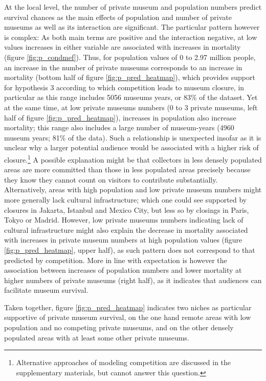 \documentclass[12pt]{article}
\begin{document}
At the local level, the number of private museum and population numbers predict survival chances as the main effects of population and number of private museums as well as its interaction are significant.
The particular pattern however is complex:
As both main terms are positive and the interaction negative, at low values increases in either variable are associated with increases in mortality (figure \ref{fig:p_condmef}).
Thus, for population values of 0 to 2.97 million people, an increase in the number of private museums corresponds to an increase in mortality (bottom half of figure \ref{fig:p_pred_heatmap}), which provides support for hypothesis 3 according to which competition leads to museum closure, in particular as this range includes 5056 museums years, or 83\% of the dataset. 
Yet at the same time, at low private museums numbers (0 to 3 private museums, left half of figure \ref{fig:p_pred_heatmap}), increases in population also increase mortality; this range also includes a large number of museum-years (4960 museum years; 81\% of the data).
Such a relationship is unexpected insofar as it is unclear why a larger potential audience would be associated with a higher risk of closure.\footnote{Alternative approaches of modeling competition are discussed in the supplementary materials, but cannot answer this question.}
A possible explanation might be that collectors in less densely populated areas are more committed than those in less populated areas precisely because they know they cannot count on visitors to contribute substantially.
Alternatively, areas with high population and low private museum numbers might more generally lack cultural infrastructure; which one could see supported by closures in Jakarta, Istanbul and Mexico City, but less so by closings in Paris, Tokyo or Madrid.
However, low private museums numbers indicating lack of cultural infrastructure might also explain the decrease in mortality associated with increases in private museum numbers at high population values (figure \ref{fig:p_pred_heatmap}, upper half), as such pattern does not correspond to that predicted by competition.
More in line with expectation is however the association between increases of population numbers and lower mortality at higher numbers of private museums (right half), as it indicates that audiences can facilitate museum survival.


Taken together, figure \ref{fig:p_pred_heatmap} indicates two niches as particular supportive of private museum survival, on the one hand remote areas with low population and no competing private museums, and on the other densely populated areas with at least some other private museums.
\end{document}
